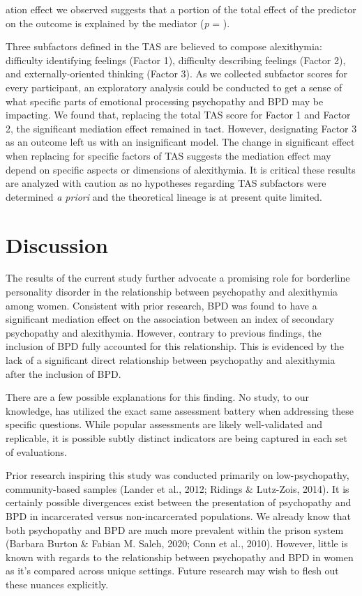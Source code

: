\documentclass[
  man,floatsintext]{apa7}
\begin{document}
ation effect we observed suggests that a portion of the total effect of the predictor on the outcome is explained by the mediator (\emph{p} = ).

Three subfactors defined in the TAS are believed to compose alexithymia: difficulty identifying feelings (Factor 1), difficulty describing feelings (Factor 2), and externally-oriented thinking (Factor 3). As we collected subfactor scores for every participant, an exploratory analysis could be conducted to get a sense of what specific parts of emotional processing psychopathy and BPD may be impacting. We found that, replacing the total TAS score for Factor 1 and Factor 2, the significant mediation effect remained in tact. However, designating Factor 3 as an outcome left us with an insignificant model. The change in significant effect when replacing for specific factors of TAS suggests the mediation effect may depend on specific aspects or dimensions of alexithymia. It is critical these results are analyzed with caution as no hypotheses regarding TAS subfactors were determined \emph{a priori} and the theoretical lineage is at present quite limited.

\hypertarget{discussion}{%
\section{Discussion}\label{discussion}}

The results of the current study further advocate a promising role for borderline personality disorder in the relationship between psychopathy and alexithymia among women. Consistent with prior research, BPD was found to have a significant mediation effect on the association between an index of secondary psychopathy and alexithymia. However, contrary to previous findings, the inclusion of BPD fully accounted for this relationship. This is evidenced by the lack of a significant direct relationship between psychopathy and alexithymia after the inclusion of BPD.

There are a few possible explanations for this finding. No study, to our knowledge, has utilized the exact same assessment battery when addressing these specific questions. While popular assessments are likely well-validated and replicable, it is possible subtly distinct indicators are being captured in each set of evaluations.

Prior research inspiring this study was conducted primarily on low-psychopathy, community-based samples (Lander et al., 2012; Ridings \& Lutz-Zois, 2014). It is certainly possible divergences exist between the presentation of psychopathy and BPD in incarcerated versus non-incarcerated populations. We already know that both psychopathy and BPD are much more prevalent within the prison system (Barbara Burton \& Fabian M. Saleh, 2020; Conn et al., 2010). However, little is known with regards to the relationship between psychopathy and BPD in women as it's compared across unique settings. Future research may wish to flesh out these nuances explicitly.
\end{document}
